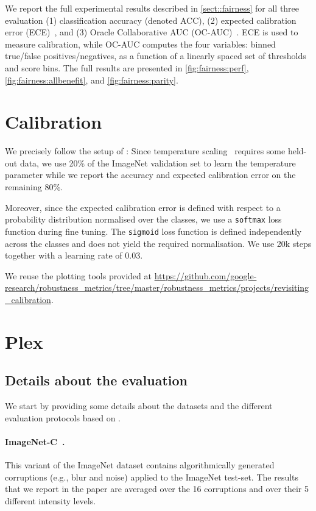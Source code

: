 \documentclass{article}
\begin{document}
We report the full experimental results described in \cref{sect::fairness} for all three evaluation (1) classification accuracy (denoted ACC), (2) expected calibration error (ECE)~\citep{naeini2015obtaining,guo2017calibration}, and (3) Oracle Collaborative AUC (OC-AUC)~\citep{kivlichan2021measuring}. 
ECE is used to measure calibration, while OC-AUC computes the four variables: binned true/false positives/negatives, as a function of a linearly spaced set of thresholds and score bins. The full results are presented in \cref{fig:fairness:perf}, \cref{fig:fairness:allbenefit}, and \cref{fig:fairness:parity}. \section{Calibration}\label{app:calibration}

We precisely follow the setup of \citet{minderer2021revisiting}: Since temperature scaling~\citep{guo2017calibration} requires some held-out data, we use 20\% of the ImageNet validation set to learn the temperature parameter while we report the accuracy and expected calibration error on the remaining 80\%.

Moreover, since the expected calibration error is defined with respect to a probability distribution normalised over the classes, we use a \texttt{softmax} loss function during fine tuning. The \texttt{sigmoid} loss function is defined independently across the classes and does not yield the required normalisation. We use 20k steps together with a learning rate of 0.03. 

We reuse the plotting tools provided at \url{https://github.com/google-research/robustness_metrics/tree/master/robustness_metrics/projects/revisiting_calibration}. \section{Plex}
\label{app:plex}

\subsection{Details about the evaluation}

We start by providing some details about the datasets and the different evaluation protocols based on \citet{djolonga2020robustness}.

\paragraph{ImageNet-C~\citep{hendrycks2019benchmarking}.} This variant of the ImageNet dataset contains algorithmically generated corruptions (e.g., blur and noise) applied to the ImageNet test-set. The results that we report in the paper are averaged over the 16 corruptions and over their 5 different intensity levels.
\end{document}
